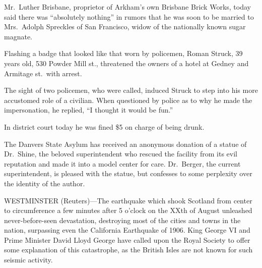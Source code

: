 \documentclass{newspaper1920}
\begin{document}
\begin{multicols}{3}
Mr.~Luther Brisbane, proprietor of Arkham's own Brisbane Brick Works,
today said there was ``absolutely nothing'' in rumors that he was soon
to be married to Mrs.~Adolph Spreckles of San Francisco, widow of the
nationally known sugar magnate.

\halfrule


Flashing a badge that looked like that worn by policemen, Roman
Struck, 39 years old, 530 Powder Mill st., threatened the owners of a
hotel at Gedney and Armitage st.\ with arrest.

The sight of two policemen, who were called, induced Struck to step
into his more accustomed role of a civilian.  When questioned by
police as to why he made the impersonation, he replied, ``I thought it
would be fun.''

In district court today he was fined \$5 on charge of being drunk.

\halfrule


The Danvers State Asylum has received an anonymous donation of a
statue of Dr.~Shine, the beloved superintendent who rescued the
facility from its evil reputation and made it into a model center for
care.  Dr.~Berger, the current superintendent, is pleased with the
statue, but confesses to some perplexity over the identity of the
author.

\columnbreak

\noindent
\begin{minipage}[t][37\baselineskip]{2\columnwidth+1\columnsep}
\fancyrule
\vspace{-\baselineskip}

\begin{multicols}{2}
WESTMINSTER (Reuters)---The earthquake which shook Scotland from
center to circumference a few minutes after 5 o'clock on the XXth of
August unleashed never-before-seen devastation, destroying most of the
cities and towns in the nation, surpassing even the California
Earthquake of 1906.  King George VI and Prime Minister David Lloyd
George have called upon the Royal Society to offer some explanation of
this catastrophe, as the British Isles are not known for such seismic
activity.


\end{multicols}
\end{minipage}
\end{multicols}
\end{document}
